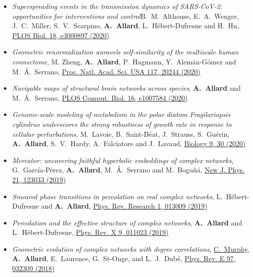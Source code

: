 \documentclass[11pt]{article}
\begin{document}
\begin{itemize}
%
  \item \textit{Superspreading events in the transmission dynamics of SARS-CoV-2: opportunities for interventions and control}B.~M.~Althouse, E.~A.~Wenger, J.~C.~Miller, S.~V.~Scarpino, \textbf{A.~Allard}, L.~H\'ebert-Dufresne and H.~Hu, \href{https://doi.org/10.1371/journal.pbio.3000897}{PLOS Biol. 18, e3000897 (2020)}%
%
  \item \textit{Geometric renormalization unravels self-similarity of the multiscale human connectome}, M. Zheng, \textbf{A.~Allard}, P.~Hagmann, Y.~Alem\'an-G\'omez and M.~\'A.~Serrano, \href{http://doi.org/10.1073/pnas.1922248117}{Proc. Natl. Acad. Sci. USA 117, 20244 (2020)}%
%
  \item \textit{Navigable maps of structural brain networks across species}, \textbf{A.~Allard} and M.~\'A.~Serrano, \href{https://doi.org/10.1371/journal.pcbi.1007584}{PLOS Comput. Biol. 16, e1007584 (2020)}%
  \item \textit{Genome-scale modeling of metabolism in the polar diatom Fragilariopsis cylindrus underscores the strong robustness of growth rate in response to cellular perturbations}, M.~Lavoie, B.~Saint-Béat, J.~Strauss, S.~Guérin, \textbf{A.~Allard}, S.~V.~Hardy, A.~Falciatore and J.~Lavaud, \href{https://doi.org/10.3390/biology9020030}{Biology 9, 30 (2020)}%
%
  \item \textit{Mercator: uncovering faithful hyperbolic embeddings of complex networks}, G.~Garc\'ia-P\'erez\footnotemark, \textbf{A.~Allard}\textsuperscript{}, M.~\'A.~Serrano and M.~Bogu\~n\'a, \href{https://doi.org/10.1088/1367-2630/ab57d2}{New J. Phys. 21, 123033 (2019)}%
%
%
  \setcounter{EqualContribution}{\value{footnote}}
%
  \item \textit{Smeared phase transitions in percolation on real complex networks}, L.~H\'ebert-Dufresne and \textbf{A.~Allard}, \href{http://doi.org/10.1103/PhysRevResearch.1.013009}{Phys. Rev. Research 1, 013009 (2019)}%
%
  \item \textit{Percolation and the effective structure of complex networks}, \textbf{A.~Allard} and L.~H\'ebert-Dufresne, \href{http://doi.org/10.1103/PhysRevX.9.011023}{Phys. Rev. X 9, 011023 (2019)}%
%
  \item \textit{Geometric evolution of complex networks with degree correlations}, \uline{C.~Murphy}, \textbf{A.~Allard}, E.~Laurence, G.~St-Onge, and L.~J.~Dub\'e, \href{http://doi.org/10.1103/PhysRevE.97.032309}{Phys. Rev. E 97, 032309 (2018)}%

\end{itemize}
\end{document}
